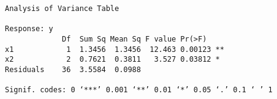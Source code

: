 \documentclass{article}
\begin{document}
\begin{verbatim}
Analysis of Variance Table

Response: y
             Df  Sum Sq Mean Sq F value Pr(>F)    
x1            1  1.3456  1.3456  12.463 0.00123 **
x2            2  0.7621  0.3811   3.527 0.03812 * 
Residuals    36  3.5584  0.0988                   

Signif. codes: 0 ‘***’ 0.001 ‘**’ 0.01 ‘*’ 0.05 ‘.’ 0.1 ‘ ’ 1
\end{verbatim}
\end{document}
